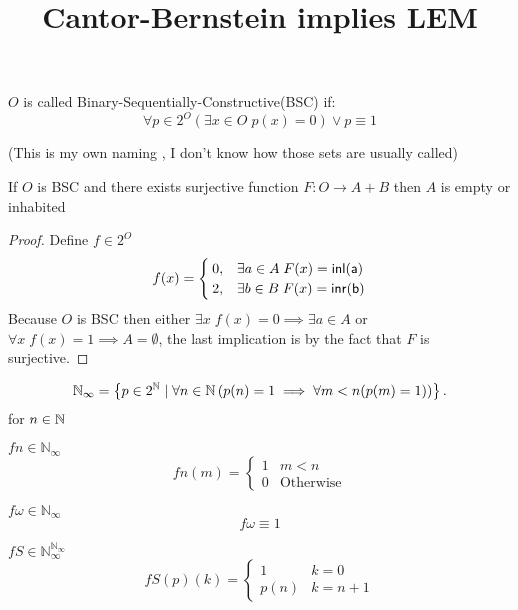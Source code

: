 

\newcommand{\inl}{\sf{inl}}
\newcommand{\inr}{\sf{inr}}
\newcommand{\NI}{\mathbb{N}_\infty}
\newcommand{\fw}{f\omega}

\title{Cantor-Bernstein implies LEM}


	
	\maketitle
	\begin{definition}
		$O$ is called Binary-Sequentially-Constructive(BSC) if: $$\forall p\in 2^O\left(\exists x\in O\;p(x)=0\right)\lor p\equiv 1$$
	\end{definition}
	(This is my own naming
	, I don't know how those sets are usually called)
	
	\begin{lemma}
		If $O$ is BSC and there exists surjective function $F:O\to A+B$ then $A$ is empty or inhabited
	\end{lemma}
	
	\begin{proof}
		Define $f\in 2^O$
		$$f(x)=\begin{cases}
			0, & \exists a\in A\;F(x)=\inl(a)\\
			2, & \exists b\in B\;F(x)=\inr(b)
		\end{cases}$$
		Because $O$ is BSC then either $\exists x\;f(x)=0\implies \exists a\in A$ or $\forall x\;f(x)=1\implies A=\emptyset$, the last implication is by the fact that $F$ is surjective.
	\end{proof}
	
	\theoremstyle{definition}
	\begin{definition}{}
		\hfill \break
		$$\NI=\left\{p\in 2^\N\mid\forall n\in\N\left(p(n)=1\implies \forall m<n(p(m)=1)\right)\right\}.$$
		for $n\in\mathbb N$
		
		$fn\in\NI$ $$fn(m)=\begin{cases}1&m<n\\0&\mbox{Otherwise}\end{cases}$$
		
		$\fw\in\NI$ $$\fw\equiv 1$$
		
		$fS\in\NI^{\NI}$ $$fS(p)(k)=\begin{cases}1&k=0\\p(n)&k=n+1\end{cases}$$
	\end{definition}
	
